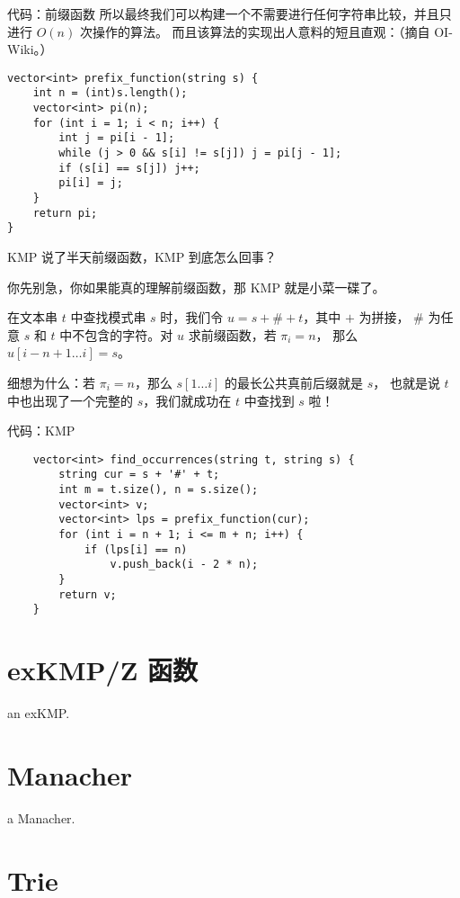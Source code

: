 \documentclass[table]{beamer}
\begin{document}
\begin{frame}[fragile]{代码：前缀函数}
	所以最终我们可以构建一个不需要进行任何字符串比较，并且只进行 $O(n)$ 次操作的算法。
	而且该算法的实现出人意料的短且直观：（摘自 OI-Wiki。）
\begin{verbatim}
vector<int> prefix_function(string s) {
    int n = (int)s.length();
    vector<int> pi(n);
    for (int i = 1; i < n; i++) {
        int j = pi[i - 1];
        while (j > 0 && s[i] != s[j]) j = pi[j - 1];
        if (s[i] == s[j]) j++;
        pi[i] = j;
    }
    return pi;
}
\end{verbatim}
\end{frame}

\begin{frame}{KMP}
	说了半天前缀函数，KMP 到底怎么回事？
	\pause

	你先别急，你如果能真的理解前缀函数，那 KMP 就是小菜一碟了。
	\pause

	在文本串 $t$ 中查找模式串 $s$ 时，我们令 $u=s+\#+t$，其中 $+$ 为拼接，
	$\#$ 为任意 $s$ 和 $t$ 中不包含的字符。对 $u$ 求前缀函数，若 $\pi_i=n$，
	那么 $u[i-n+1\dots i]=s$。
	\pause

	细想为什么：若 $\pi_i=n$，那么 $s[1\dots i]$ 的最长公共真前后缀就是 $s$，
	也就是说 $t$ 中也出现了一个完整的 $s$，我们就成功在 $t$ 中查找到 $s$ 啦！
\end{frame}

\begin{frame}[fragile]{代码：KMP}
\begin{verbatim}
    vector<int> find_occurrences(string t, string s) {
        string cur = s + '#' + t;
        int m = t.size(), n = s.size();
        vector<int> v;
        vector<int> lps = prefix_function(cur);
        for (int i = n + 1; i <= m + n; i++) {
            if (lps[i] == n)
                v.push_back(i - 2 * n);
        }
        return v;
    }
\end{verbatim}
\end{frame}

\section{exKMP/Z 函数}

\begin{frame}
	an exKMP.
\end{frame}

\section{Manacher}

\begin{frame}
	a Manacher.
\end{frame}

\section{Trie}

\begin{frame}
	
\end{frame}
\end{document}
